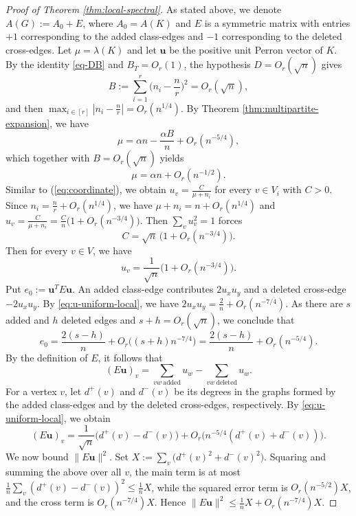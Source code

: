 \documentclass[11pt,a4paper]{article}
\theoremstyle{definition}
\theoremstyle{plain}
\renewcommand{\le}{\leqslant}
\begin{document}
\begin{proof}[Proof of Theorem \ref{thm:local-spectral}]
As stated above, 
we denote $A(G):=A_0+E$, where $A_0=A(K)$ and $E$ is a symmetric matrix with entries $+1$ corresponding to the
added class-edges and $-1$ corresponding to the deleted cross-edges. Let $\mu=\lambda(K)$ and let 
$\bm{u}$ be the positive unit Perron vector of $K$. 
By the identity \eqref{eq-DB} and $B_T=O_r(1)$, the hypothesis $D=O_r(\sqrt n)$ gives
$$B:=\sum_{i=1}^r \Big(n_i-\frac nr \Big)^2=O_r(\sqrt n),$$
 and then $\max_{i\in [r]} |n_i-\tfrac nr|=O_r(n^{1/4})$.
By Theorem \ref{thm:multipartite-expansion}, we have 
$$ \mu=\alpha n-\frac{\alpha B}{n}+O_r(n^{-5/4}), $$ 
which together with $B=O_r(\sqrt n)$ yields  
\begin{equation} \label{eq:mu}
\mu=\alpha n+O_r(n^{-1/2}). 
\end{equation}
Similar to (\ref{eq:coordinate}), 
we obtain 
$u_v= \frac{C}{\mu+n_i }$ for every $v\in V_i$ with $C>0$. Since $n_i=\frac{n}{r} + O_r(n^{1/4})$, 
we have $\mu+n_i= n+O_r(n^{1/4})$ and 
$   u_v=\frac{C}{\mu+n_i}=\frac{C}{n}\bigl(1+O_r(n^{-3/4})\bigr)$. 
 Then $\sum_v u_v^2=1$ forces 
 $$C=\sqrt n\,\bigl(1+O_r(n^{-3/4})\bigr).$$ 
Then for every $v\in V$, we have 
\begin{equation}
        u_v=\frac1{\sqrt n}\bigl(1+O_r(n^{-3/4})\bigr) .
        \label{eq:u-uniform-local}
\end{equation} 
Put $e_0:=\bm{u}^{T}E\bm{u}$. An added class-edge contributes $2u_xu_y$ and a deleted
cross-edge $-2u_xu_y$. By \eqref{eq:u-uniform-local}, we have 
$2u_xu_y=\frac2n+O_r(n^{-7/4})$. As there are $s$ added and $h$ deleted edges and
$s+h=O_r(\sqrt n)$, we conclude that 
\begin{equation} \label{eq-e0}
        e_0=\frac{2(s-h)}{n}+O_r\bigl((s+h)n^{-7/4}\bigr)
           =\frac{2(s-h)}{n}+O_r(n^{-5/4}).
\end{equation} 
By the definition of $E$, it follows that 
$$(E\bm{u})_v=\sum_{vw\ \mathrm{added}}u_w-\sum_{vw\ \mathrm{deleted}}u_w.$$ 
For a vertex $v$, let $d^{+}(v)$ and $d^{-}(v)$ be its degrees in the graphs formed by
the added class-edges and by the deleted cross-edges, respectively. 
By \eqref{eq:u-uniform-local}, we obtain 
\[
        (E\bm{u})_v=\frac1{\sqrt n}\bigl(d^{+}(v)-d^{-}(v)\bigr)
              +O_r\bigl(n^{-5/4}(d^{+}(v)+d^{-}(v))\bigr).
\]
We now bound $\|E\bm{u}\|^2$. 
Set $X:=\sum_v\bigl(d^{+}(v)^2+d^{-}(v)^2\bigr)$. Squaring and summing the above over all $v$, the main term
is at most $\frac1n\sum_v(d^{+}(v)-d^{-}(v))^2\le\frac1nX$, while
the squared error term is $O_r(n^{-5/2})X$, and 
the cross term is 
$O_r(n^{-7/4})X$.  Hence $\|E\bm{u}\|^2\le\frac{1}{n}X + O_r(n^{-7/4})X$. 


\end{proof}
\end{document}
